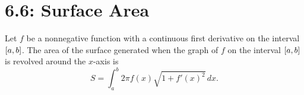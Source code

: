\documentclass[../mathNotesPreamble]{subfiles}
\begin{document}
  \section*{6.6: Surface Area}

  \begin{defn*}
    Let $f$ be a nonnegative function with a continuous first derivative on the interval ${\left[a,b\right]}$. The area of the surface generated when the graph of $f$ on the interval ${\left[a,b\right]}$ is revolved around the $x$-axis is
      \[S=\int_a^b 2\pi f(x)\sqrt{1+f'(x)^2}\,dx.\]
  \end{defn*}

  
\end{document}
